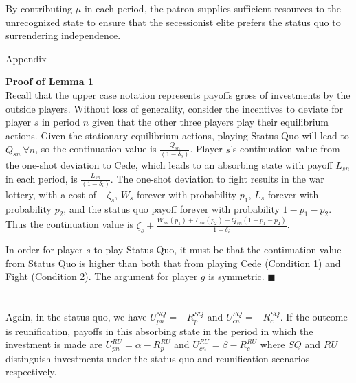 \documentclass[12pt]{article}
\begin{document}

By contributing $\mu$ in each period, the patron supplies sufficient resources to the unrecognized state to ensure that the secessionist elite prefers the status quo to surrendering independence. 

\newpage
Appendix

{\bf Proof of Lemma 1} \\
Recall that the upper case notation represents payoffs gross of investments by the outside players. Without loss of generality, consider the incentives to deviate for player $s$ in period $n$ given that the other three players play their equilibrium actions. Given the stationary equilibrium actions, playing Status Quo will lead to $Q_{sn} \ \forall n$, so the continuation value is $\frac{Q_{sn}}{(1-\delta_s)}$. Player $s$'s continuation value from the one-shot deviation to Cede, which leads to an absorbing state with payoff $L_{sn}$ in each period, is $\frac{L_{sn}}{(1-\delta_i)}$. The one-shot deviation to fight results in the war lottery, with a cost of $-\zeta_s$, $W_s$ forever with probability $p_1$, $L_s$ forever with probability $p_2$, and the status quo payoff forever with probability $1-p_1-p_2$. Thus the continuation value is $\zeta_s +\frac{W_{sn}(p_1)+ L_{sn}(p_2) +Q_{sn}(1-p_1-p_2)}{1-\delta_i}$.

In order for player $s$ to play Status Quo, it must be that the continuation value from Status Quo is higher than both that from playing Cede (Condition 1) and Fight (Condition 2). The argument for player $g$ is symmetric. \hfill $\blacksquare$
\\
\\
 \\
Again, in the status quo, we have $U_{pn}^{SQ}= -R_p^{SQ}$ and $U_{cn}^{SQ}= -R_c^{SQ}$. If the outcome is reunification, payoffs in this absorbing state in the period in which the investment is made are $U_{pn}^{RU}= \alpha -R_p^{RU}$ and $U_{cn}^{RU}= \beta -R_c^{RU}$ where $SQ$ and $RU$ distinguish investments under the status quo and reunification scenarios respectively.
\end{document}
